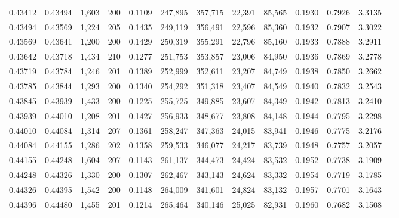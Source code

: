 \begin{tabular}{rrrrrrrrrrrrr}
0.43412 & 0.43494 & 1,603 & 200 &                                     0.1109 & 247,895 & 357,715 &  22,391 &  85,565 & 0.1930 & 0.7926 & 3.3135 \\
0.43494 & 0.43569 & 1,224 & 205 &                                     0.1435 & 249,119 & 356,491 &  22,596 &  85,360 & 0.1932 & 0.7907 & 3.3022 \\
0.43569 & 0.43641 & 1,200 & 200 &                                     0.1429 & 250,319 & 355,291 &  22,796 &  85,160 & 0.1933 & 0.7888 & 3.2911 \\
0.43642 & 0.43718 & 1,434 & 210 &                                     0.1277 & 251,753 & 353,857 &  23,006 &  84,950 & 0.1936 & 0.7869 & 3.2778 \\
0.43719 & 0.43784 & 1,246 & 201 &                                     0.1389 & 252,999 & 352,611 &  23,207 &  84,749 & 0.1938 & 0.7850 & 3.2662 \\
0.43785 & 0.43844 & 1,293 & 200 &                                     0.1340 & 254,292 & 351,318 &  23,407 &  84,549 & 0.1940 & 0.7832 & 3.2543 \\
0.43845 & 0.43939 & 1,433 & 200 &                                     0.1225 & 255,725 & 349,885 &  23,607 &  84,349 & 0.1942 & 0.7813 & 3.2410 \\
0.43939 & 0.44010 & 1,208 & 201 &                                     0.1427 & 256,933 & 348,677 &  23,808 &  84,148 & 0.1944 & 0.7795 & 3.2298 \\
0.44010 & 0.44084 & 1,314 & 207 &                                     0.1361 & 258,247 & 347,363 &  24,015 &  83,941 & 0.1946 & 0.7775 & 3.2176 \\
0.44084 & 0.44155 & 1,286 & 202 &                                     0.1358 & 259,533 & 346,077 &  24,217 &  83,739 & 0.1948 & 0.7757 & 3.2057 \\
0.44155 & 0.44248 & 1,604 & 207 &                                     0.1143 & 261,137 & 344,473 &  24,424 &  83,532 & 0.1952 & 0.7738 & 3.1909 \\
0.44248 & 0.44326 & 1,330 & 200 &                                     0.1307 & 262,467 & 343,143 &  24,624 &  83,332 & 0.1954 & 0.7719 & 3.1785 \\
0.44326 & 0.44395 & 1,542 & 200 &                                     0.1148 & 264,009 & 341,601 &  24,824 &  83,132 & 0.1957 & 0.7701 & 3.1643 \\
0.44396 & 0.44480 & 1,455 & 201 &                                     0.1214 & 265,464 & 340,146 &  25,025 &  82,931 & 0.1960 & 0.7682 & 3.1508 \\

\end{tabular}
